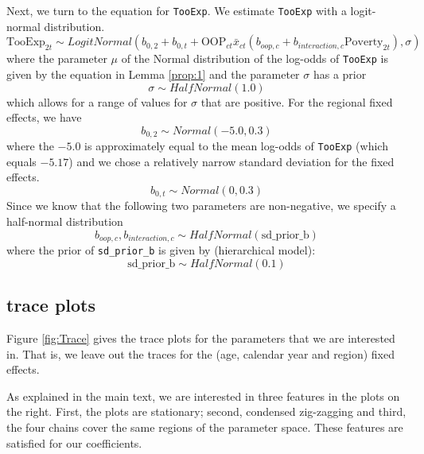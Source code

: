 \documentclass[a4paper,12pt]{article}
\begin{document}
Next, we turn to the equation for \texttt{TooExp}. We estimate \texttt{TooExp} with a logit-normal distribution.
\begin{equation}
\label{eq:TooExpDist}
\text{TooExp}_{2t} \sim LogitNormal(b_{0,2} + b_{0,t} + \text{OOP}_{ct} \bar{x}_{ct} \left(  b_{oop,c} + b_{interaction,c} \text{Poverty}_{2t} \right),\sigma)
\end{equation}
where the parameter \(\mu\) of the Normal distribution of the log-odds of \texttt{TooExp} is given by the equation in Lemma \ref{prop:1} and the parameter \(\sigma\) has a prior
\begin{equation}
\sigma \sim HalfNormal(1.0)
\end{equation}
which allows for a range of values for \(\sigma\) that are positive.
For the regional fixed effects, we have
\begin{equation}
b_{0,2} \sim Normal(-5.0,0.3)
\end{equation}
where the \(-5.0\) is approximately equal to the mean log-odds of \texttt{TooExp} (which equals \(-5.17\)) and we chose a relatively narrow standard deviation for the fixed effects.
\begin{equation}
b_{0,t} \sim Normal(0,0.3)
\end{equation}
Since we know that the following two parameters are non-negative, we specify a half-normal distribution
\begin{equation}
b_{oop,c},b_{interaction,c} \sim HalfNormal(\text{sd\_prior\_b})
\end{equation}
where the prior of \texttt{sd\_prior\_b} is given by (hierarchical model):
\begin{equation}
\text{sd\_prior\_b} \sim HalfNormal(0.1)
\end{equation}


\subsection{trace plots}
\label{sec:org440ec7e}

Figure \ref{fig:Trace} gives the trace plots for the parameters that we are interested in. That is, we leave out the traces for the (age, calendar year and region) fixed effects.

As explained in the main text, we are interested in three features in the plots on the right. First, the plots are stationary; second, condensed zig-zagging and third, the four chains cover the same regions of the parameter space. These features are satisfied for our coefficients.
\end{document}
